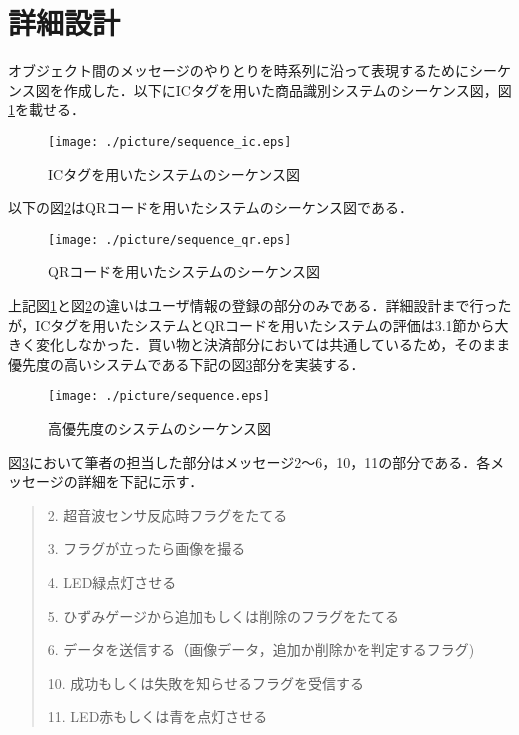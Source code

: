 

\section{詳細設計}

オブジェクト間のメッセージのやりとりを時系列に沿って表現するためにシーケンス図を作成した．以下にICタグを用いた商品識別システムのシーケンス図，図\ref{sequence_ic}を載せる．

\begin{figure}[htbp]
\centering
\texttt{[image: ./picture/sequence\_ic.eps]}
\caption{ICタグを用いたシステムのシーケンス図}
\label{sequence_ic}
\end{figure}


以下の図\ref{sequence_qr}はQRコードを用いたシステムのシーケンス図である．


\begin{figure}[htbp]
\centering
\texttt{[image: ./picture/sequence\_qr.eps]}
\caption{QRコードを用いたシステムのシーケンス図}
\label{sequence_qr}
\end{figure}


上記図\ref{sequence_ic}と図\ref{sequence_qr}の違いはユーザ情報の登録の部分のみである．詳細設計まで行ったが，ICタグを用いたシステムとQRコードを用いたシステムの評価は3.1節から大きく変化しなかった．買い物と決済部分においては共通しているため，そのまま優先度の高いシステムである下記の図\ref{sequence}部分を実装する．



\begin{figure}[htbp]
\centering
\texttt{[image: ./picture/sequence.eps]}
\caption{高優先度のシステムのシーケンス図}
\label{sequence}
\end{figure}


図\ref{sequence}において筆者の担当した部分はメッセージ2～6，10，11の部分である．各メッセージの詳細を下記に示す．


\begin{quote}
2. 超音波センサ反応時フラグをたてる

3. フラグが立ったら画像を撮る

4. LED緑点灯させる

5. ひずみゲージから追加もしくは削除のフラグをたてる

6. データを送信する（画像データ，追加か削除かを判定するフラグ)

10. 成功もしくは失敗を知らせるフラグを受信する

11. LED赤もしくは青を点灯させる
\end{quote}


